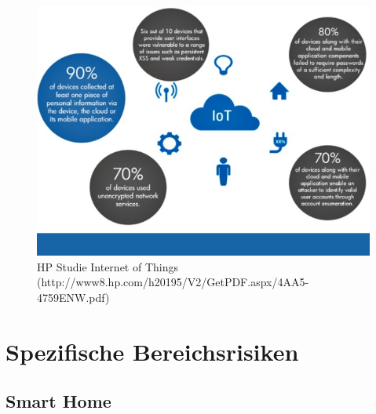 \documentclass{report}
\begin{document}
\begin{figure}[hbtp]
\centering
\includegraphics[scale=0.5]{hp-iot-security.jpg}
\caption{HP Studie Internet of Things (http://www8.hp.com/h20195/V2/GetPDF.aspx/4AA5-4759ENW.pdf)}
\end{figure}

\section{Spezifische Bereichsrisiken}

\subsection{Smart Home}
\end{document}
